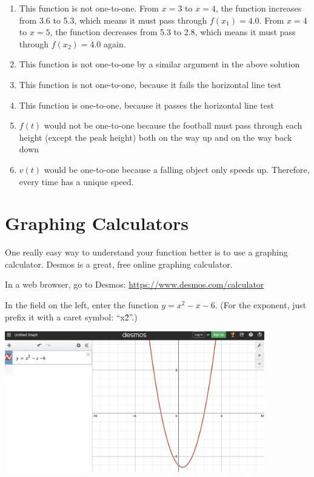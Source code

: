 \begin{Answer}[ref=invfunc1]
	\begin{enumerate}
	\item This function is not one-to-one. From $x=3$ to $x=4$, the 
	function increases from 3.6 to 5.3, which means it must pass through 
	$f(x_1)=4.0$. From $x=4$ to $x=5$, the function decreases from 5.3 to 
	2.8, which means it must pass through $f(x_2) = 4.0$ again. 
	\item This function is not one-to-one by a similar argument in the 
	above solution
	\item This function is not one-to-one, because it fails the horizontal 
	line test
	\item This function is one-to-one, because it passes the horizontal 
	line test
	\item $f(t)$ would not be one-to-one because the football must pass 
	through each height (except the peak height) both on the way up and 
	on the way back down
	\item $v(t)$ would be one-to-one because a falling object only speeds 
	up. Therefore, every time has a unique speed. 
	\end{enumerate}
\end{Answer}

\section{Graphing Calculators}

One really easy way to understand your function better is to use a graphing
calculator. Desmos is a great, free online graphing calculator. 

In a web browser, go to Desmos: \url{https://www.desmos.com/calculator}

In the field on the left, enter the function $y = x^2 - x - 6$. (For
the exponent, just prefix it with a caret symbol: ``x\^2''.)

\includegraphics[width=0.85\textwidth]{Desmos.png}
